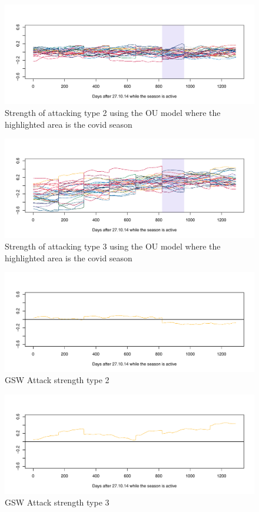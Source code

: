 \begin{figure}[H]
    \centering
    \includegraphics[width=1\textwidth]{Figures/OU2.png}
    \caption[OU2]{Strength of attacking type 2 using the OU model where the highlighted area is the covid season}
    \label{fig:OU2}
\end{figure}

\begin{figure}[H]
    \centering
    \includegraphics[width=1\textwidth]{Figures/OU3.png}
    \caption[OU3]{Strength of attacking type 3 using the OU model where the highlighted area is the covid season}
    \label{fig:OU3}
\end{figure}

\begin{figure}[H]
    \centering
    \includegraphics[width=.8\textwidth]{Figures/GSWOU2.pdf}
    \caption[GSW2OU]{GSW Attack strength type 2}
    \label{fig:GSW_2_OU}
\end{figure}

\begin{figure}[H]
    \centering
    \includegraphics[width=.8\textwidth]{Figures/GSWOU3.pdf}
    \caption[GSW3OU]{GSW Attack strength type 3}
    \label{fig:GSW_3_OU}
\end{figure}


